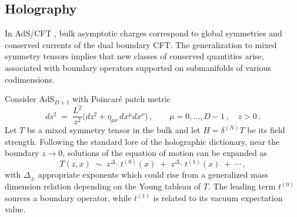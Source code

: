 \documentclass[a4paper,12pt]{article}
\begin{document}
\subsection{Holography}
In AdS/CFT \cite{Natsuume:2014sfa,Maldacena_1999,Skenderis:2002wp,Aharony:1999ti,Witten:1998qj,Gubser:1998bc}, bulk asymptotic charges correspond to global symmetries and conserved currents of the dual boundary CFT. The generalization to mixed symmetry tensors implies that new classes of conserved quantities arise, associated with boundary operators supported on submanifolds of various codimensions.

Consider $\mathrm{AdS}_{D+1}$ with Poincar\'e patch metric
\begin{equation}
  ds^{2} \;=\; \frac{L^{2}}{z^{2}}\bigl(dz^{2} + \eta_{\mu\nu}\,dx^{\mu}dx^{\nu}\bigr) \, , 
  \qquad \mu=0,\ldots,D-1 \, , \quad z>0 \, .
\end{equation}
Let $T$ be a mixed symmetry tensor in the bulk and let $H= \delta^{(N)} T$ be its field strength. Following the standard lore of the holographic dictionary, near the boundary $z\to 0$, solutions of the equation of motion can be expanded as
\begin{equation}
  T(z,x) \;\sim\; z^{\Delta_{-}}\, t^{(0)}(x) \;+\; z^{\Delta_{+}}\, t^{(1)}(x) \;+\; \cdots \, ,
\end{equation}
with $\Delta_{\pm}$ appropriate exponents which could rise from a generalized mass dimension relation depending on the Young tableau of $T$. The leading term $t^{(0)}$ sources a boundary operator, while $t^{(1)}$ is related to its vacuum expectation value.
\end{document}
